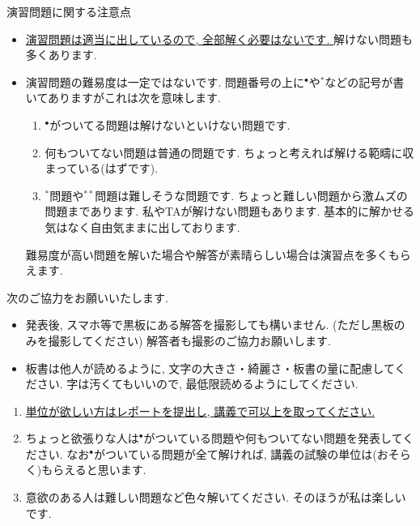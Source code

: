 \documentclass[dvipdfmx,a4paper,11pt]{article}
\theoremstyle{definition}
\begin{document}
\hspace{-18pt}演習問題に関する注意点
\begin{itemize}
  \setlength{\parskip}{0cm} 
  \setlength{\itemsep}{0cm} 
\item \underline{演習問題は適当に出しているので, 全部解く必要はないです. } 解けない問題も多くあります.
\item 演習問題の難易度は一定ではないです. 問題番号の上に$^\bullet$や$^*$などの記号が書いてありますがこれは次を意味します.
\begin{enumerate}
  \setlength{\parskip}{0cm} 
  \setlength{\itemsep}{0cm} 
\item $^\bullet$がついてる問題は解けないといけない問題です. %
\item 何もついてない問題は普通の問題です. ちょっと考えれば解ける範疇に収まっている(はずです). %
\item $^*$問題や$^{**}$問題は難しそうな問題です. ちょっと難しい問題から激ムズの問題まであります. 私やTAが解けない問題もあります. 基本的に解かせる気はなく自由気ままに出しております. %
\end{enumerate}
難易度が高い問題を解いた場合や解答が素晴らしい場合は演習点を多くもらえます.
\end{itemize}

\hspace{-18pt}次のご協力をお願いいたします.
\begin{itemize}
  \setlength{\parskip}{0cm} 
  \setlength{\itemsep}{0cm} 
\item 発表後, スマホ等で黒板にある解答を撮影しても構いません. (ただし黒板のみを撮影してください) %
解答者も撮影のご協力お願いします.
\item 板書は他人が読めるように, 文字の大きさ・綺麗さ・板書の量に配慮してください. 字は汚くてもいいので, 最低限読めるようにしてください. %
\end{itemize}


\medskip
{}
\begin{enumerate}
  \setlength{\parskip}{0cm} 
  \setlength{\itemsep}{0cm} 
\item \underline{単位が欲しい方はレポートを提出し, 講義で可以上を取ってください.} %
\item ちょっと欲張りな人は$^\bullet$がついている問題や何もついてない問題を発表してください. なお$^{\bullet}$がついている問題が全て解ければ, 講義の試験の単位は(おそらく)もらえると思います.
\item 意欲のある人は難しい問題など色々解いてください. そのほうが私は楽しいです.
\end{enumerate}
\end{document}
